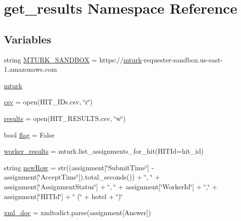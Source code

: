 \hypertarget{namespaceget__results}{}\section{get\+\_\+results Namespace Reference}
\label{namespaceget__results}
\subsection*{Variables}
\begin{DoxyCompactItemize}
\item 
string \hyperlink{namespaceget__results_ae62b2c698fe34f48fcc67433b6495a00}{M\+T\+U\+R\+K\+\_\+\+S\+A\+N\+D\+B\+OX} = \textquotesingle{}https\+://\hyperlink{namespaceget__results_a5d236ec2d0fb7be80dec953c4f7564d7}{mturk}-\/requester-\/sandbox.\+us-\/east-\/1.amazonaws.\+com\textquotesingle{}
\item 
\hyperlink{namespaceget__results_a5d236ec2d0fb7be80dec953c4f7564d7}{mturk}
\item 
\hyperlink{namespaceget__results_a8c4ebdc20b35d7f4ede09b2cc3b26db0}{csv} = open(\textquotesingle{}H\+I\+T\+\_\+\+I\+Ds.\+csv\textquotesingle{}, \char`\"{}r\char`\"{})
\item 
\hyperlink{namespaceget__results_a339bb5524b06e496a6aaa0a97a4a8d21}{results} = open(\textquotesingle{}H\+I\+T\+\_\+\+R\+E\+S\+U\+L\+T\+S.\+csv\textquotesingle{}, \char`\"{}w\char`\"{})
\item 
bool \hyperlink{namespaceget__results_a8b3ab54ed3e81c69863d65e4e6c424a0}{flag} = False
\item 
\hyperlink{namespaceget__results_adecf8258a14164dab061b9f9f19f7eea}{worker\+\_\+results} = mturk.\+list\+\_\+assignments\+\_\+for\+\_\+hit(H\+I\+T\+Id=hit\+\_\+id)
\item 
string \hyperlink{namespaceget__results_a7aa3be069dfb467ab7266a010a7ed8af}{new\+Row} = str((assignment\mbox{[}\char`\"{}Submit\+Time\char`\"{}\mbox{]} -\/ assignment\mbox{[}\char`\"{}Accept\+Time\char`\"{}\mbox{]}).total\+\_\+seconds()) + \char`\"{}, \char`\"{} + assignment\mbox{[}\char`\"{}Assignment\+Status\char`\"{}\mbox{]} + \char`\"{}, \char`\"{} + assignment\mbox{[}\char`\"{}Worker\+Id\char`\"{}\mbox{]} + \char`\"{},\char`\"{} + assignment\mbox{[}\char`\"{}H\+I\+T\+Id\char`\"{}\mbox{]} + \char`\"{} (\char`\"{} + hotel + \char`\"{})\char`\"{}
\item 
\hyperlink{namespaceget__results_af12d72131e6cb1449b28b0005d278315}{xml\+\_\+doc} = xmltodict.\+parse(assignment\mbox{[}\textquotesingle{}Answer\textquotesingle{}\mbox{]})
\end{DoxyCompactItemize}



